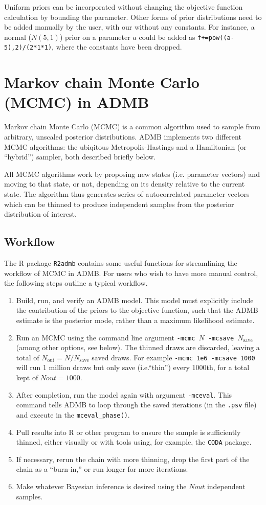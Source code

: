 \documentclass{article}\usepackage[]{graphicx}\usepackage[]{color}
\begin{document}
Uniform priors can be incorporated without changing the
objective function calculation by bounding the
parameter. Other forms of prior distributions need to be
added manually by the user, with our without any
constants. For instance, a normal ($N(5,1)$) prior on a
parameter $a$ could be added as
\texttt{f+=pow((a-5),2)/(2*1*1)}, where the constants have
been dropped.

\section{Markov chain Monte Carlo (MCMC) in ADMB}
Markov chain Monte Carlo (MCMC) is a common algorithm used
to sample from arbitrary, unscaled posterior
distributions. ADMB implements two different MCMC
algorithms: the ubiqitous Metropolis-Hastings and a
Hamiltonian (or ``hybrid'') sampler, both described briefly
below.

All MCMC algorithms work by proposing new states
(i.e. parameter vectors) and moving to that state, or not,
depending on its density relative to the current state. The
algorithm thus generates series of autocorrelated parameter
vectors which can be thinned to produce independent samples
from the posterior distribution of interest.

\subsection{Workflow}
The R package \texttt{R2admb} contains some useful functions
for streamlining the workflow of MCMC in ADMB. For users who
wish to have more manual control, the following steps
outline a typical workflow.
\begin{enumerate}
\item Build, run, and verify an ADMB model. This model must
  explicitly include the contribution of the priors to the
  objective function, such that the ADMB estimate is the
  posterior mode, rather than a maximum likelihood estimate.
\item Run an MCMC using the command line argument
  \texttt{-mcmc $N$ -mcsave $N_{\text{save}}$} (among other
  options, see below). The thinned draws are discarded,
  leaving a total of $N_{\text{out}}=N/N_{\text{save}}$
  saved draws. For example \texttt{-mcmc 1e6 -mcsave 1000}
  will run 1 million draws but only save (i.e.``thin'')
  every 1000th, for a total kept of $Nout=1000$.
\item After completion, run the model again with argument
  \texttt{-mceval}. This command tells ADMB to loop through
  the saved iterations (in the \texttt{.psv} file) and
  execute in the \texttt{mceval\_phase()}.
\item Pull results into R or other program to ensure the
  sample is sufficiently thinned, either visually or with
  tools using, for example, the \texttt{CODA} package.
\item If necessary, rerun the chain with more thinning, drop
  the first part of the chain as a ``burn-in,'' or run
  longer for more iterations.
\item Make whatever Bayesian inference is desired using the
  $Nout$ independent samples.
\end{enumerate}
\end{document}
